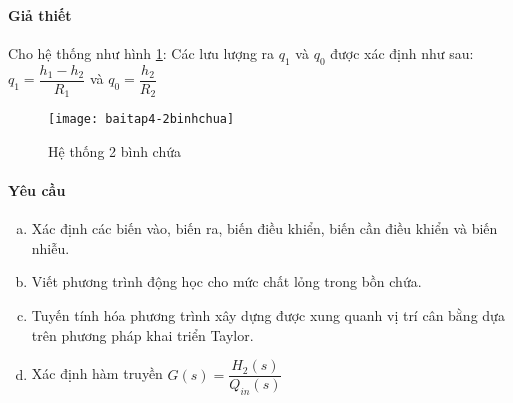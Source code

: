 \paragraph{Giả thiết}
    Cho hệ thống như hình \ref{baitap2}: Các lưu lượng ra $q_1$ và $q_0$ được xác định như sau: $q_1 = \dfrac{h_1 - h_2}{R_1}$ và $q_0 = \dfrac{h_2}{R_2}$
    \begin{figure}[htp]
        \begin{center}
            \texttt{[image: baitap4-2binhchua]}
        \end{center}
        \caption{Hệ thống 2 bình chứa} \label{baitap2}
    \end{figure}

\paragraph{Yêu cầu}
    \begin{enumerate}[a.]
        \item Xác định các biến vào, biến ra, biến điều khiển, biến cần điều khiển và biến nhiễu.
        \item Viết phương trình động học cho mức chất lỏng trong bồn chứa.
        \item Tuyến tính hóa phương trình xây dựng được xung quanh vị trí cân bằng dựa trên phương pháp khai triển Taylor.
        \item Xác định hàm truyền $G(s) = \dfrac{H_2(s)}{Q_{in}(s)}$
    \end{enumerate}

